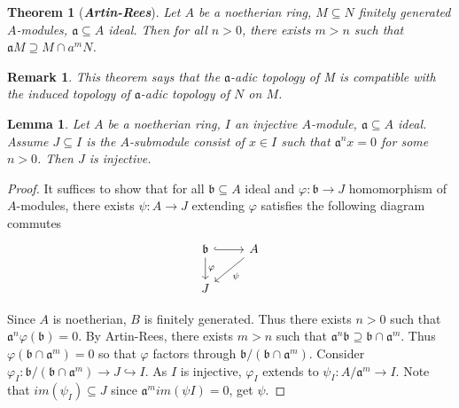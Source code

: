 \documentclass{ctexart}
\newtheorem{remark}{Remark}[section]
\newtheorem{theorem}{Theorem}[section]
\newtheorem{lemma}{Lemma}[section]
\begin{document}
\begin{theorem}[\textbf{\emph{Artin-Rees}}]
    Let $A$ be a noetherian ring, $M \subseteq N$ finitely generated $A$-modules, $\mathfrak{a} \subseteq A$ ideal.
    Then for all $n > 0$, there exists $m > n$ such that $\mathfrak{a}M \supseteq M \cap a^{m}N$.
    \vspace{-\baselineskip} %
    \label{Theorem 7.2}
\end{theorem}
\begin{remark}
    This theorem says that the $\mathfrak{a}$-adic topology of M is compatible with the induced topology of $\mathfrak{a}$-adic topology of $N$ on $M$. 
\end{remark}
\begin{lemma}
    Let $A$ be a noetherian ring, $I$ an injective $A$-module, $\mathfrak{a} \subseteq A$ ideal.
    Assume $J \subseteq I$ is the $A$-submodule consist of $x\in I$ such that $\mathfrak{a}^{n}x= 0$ for some $n > 0$.
    Then $J$ is injective.
    \label{Lemma 7.1}
\end{lemma}
\begin{proof}
    It suffices to show that for all $\mathfrak{b} \subseteq A$ ideal and $\varphi: \mathfrak{b} \longrightarrow J$ homomorphism of $A$-modules,
    there exists $\psi: A \longrightarrow J$ extending $\varphi$ satisfies the following diagram commutes
    \begin{equation*}
        \begin{tikzcd}
            \mathfrak{b} \arrow[r, hookrightarrow] \arrow[d, "\varphi"] &
            A \arrow[dl, "\psi"] \\
            J &
        \end{tikzcd}
    \end{equation*}
    \par
    Since $A$ is noetherian, $B$ is finitely generated.
    Thus there exists $n > 0$ such that $\mathfrak{a}^{n}\varphi(\mathfrak{b}) = 0$.
    By Artin-Rees, there exists $m > n$ such that $\mathfrak{a}^{n}\mathfrak{b} \supseteq \mathfrak{b} \cap \mathfrak{a}^{m}$.
    Thus $\varphi(\mathfrak{b} \cap \mathfrak{a}^{m}) = 0$ so that $\varphi$ factors through $\mathfrak{b}/(\mathfrak{b} \cap \mathfrak{a}^{m})$.
    Consider $\varphi_{I}: \mathfrak{b}/(\mathfrak{b} \cap \mathfrak{a}^{m}) \longrightarrow J \hookrightarrow I$.
    As $I$ is injective, $\varphi_{I}$ extends to $\psi_{I}: A/\mathfrak{a}^{m} \longrightarrow I$.
    Note that $im(\psi_{I}) \subseteq J$ since $\mathfrak{a}^{m}im(\psi{I}) = 0$, get $\psi$. 
\end{proof}
\end{document}
